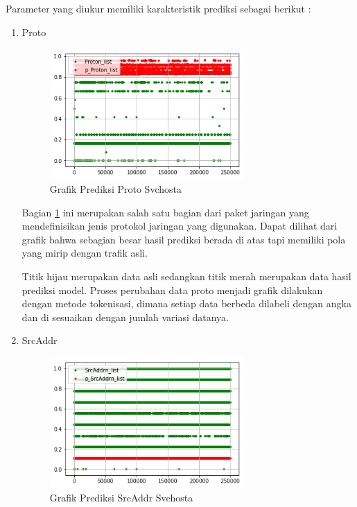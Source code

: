 \documentclass[./skripsi.tex]{subfiles}
\begin{document}
\par Parameter yang diukur memiliki karakteristik prediksi sebagai berikut :
\begin{enumerate}
    \item Proto
    \begin{figure}%
        \centering
        \includegraphics[width=0.7\textwidth]{public/assets/img/lstmm_svchosta_pred1.png}
        \caption{Grafik Prediksi Proto Svchosta}
        \label{fig:lstmm_svchosta_pred1}
    \end{figure}
    
    \par Bagian \ref{fig:lstmm_svchosta_pred1} ini merupakan salah satu bagian dari paket jaringan yang mendefinisikan jenis protokol jaringan yang digunakan. Dapat dilihat dari grafik bahwa sebagian besar hasil prediksi berada di atas tapi memiliki pola yang mirip dengan trafik asli.
    \par Titik hijau merupakan data asli sedangkan titik merah merupakan data hasil prediksi model. Proses perubahan data proto menjadi grafik dilakukan dengan metode tokenisasi, dimana setiap data berbeda dilabeli dengan angka dan di sesuaikan dengan jumlah variasi datanya.
    
    \item SrcAddr
    \begin{figure}%
        \centering
        \includegraphics[width=0.7\textwidth] {public/assets/img/lstmm_svchosta_pred2.png}
        \caption{Grafik Prediksi SrcAddr Svchosta}
        \label{fig:lstmm_svchosta_pred2}
    \end{figure}
    

\end{enumerate}
\end{document}
